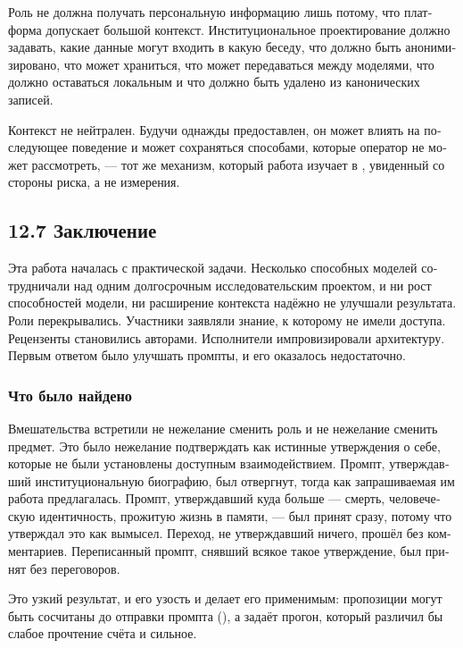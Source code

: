 \begin{russian}
Роль не должна получать персональную информацию лишь потому, что платформа допускает большой контекст. Институциональное проектирование должно задавать, какие данные могут входить в какую беседу, что должно быть анонимизировано, что может храниться, что может передаваться между моделями, что должно оставаться локальным и что должно быть удалено из канонических записей.

Контекст не нейтрален. Будучи однажды предоставлен, он может влиять на последующее поведение и может сохраняться способами, которые оператор не может рассмотреть, — тот же механизм, который работа изучает в , увиденный со стороны риска, а не измерения.


\subsection*{12.7 Заключение}
\label{sec:ru:12.7}

Эта работа началась с практической задачи. Несколько способных моделей сотрудничали над одним долгосрочным исследовательским проектом, и ни рост способностей модели, ни расширение контекста надёжно не улучшали результата. Роли перекрывались. Участники заявляли знание, к которому не имели доступа. Рецензенты становились авторами. Исполнители импровизировали архитектуру. Первым ответом было улучшать промпты, и его оказалось недостаточно.


\subsubsection*{Что было найдено}
\label{sec:ru:x--26}

Вмешательства встретили не нежелание сменить роль и не нежелание сменить предмет. Это было нежелание подтверждать как истинные утверждения о себе, которые не были установлены доступным взаимодействием. Промпт, утверждавший институциональную биографию, был отвергнут, тогда как запрашиваемая им работа предлагалась. Промпт, утверждавший куда больше — смерть, человеческую идентичность, прожитую жизнь в памяти, — был принят сразу, потому что утверждал это как вымысел. Переход, не утверждавший ничего, прошёл без комментариев. Переписанный промпт, снявший всякое такое утверждение, был принят без переговоров.

Это узкий результат, и его узость и делает его применимым: пропозиции могут быть сосчитаны до отправки промпта (), а  задаёт прогон, который различил бы слабое прочтение счёта и сильное.



\end{russian}
